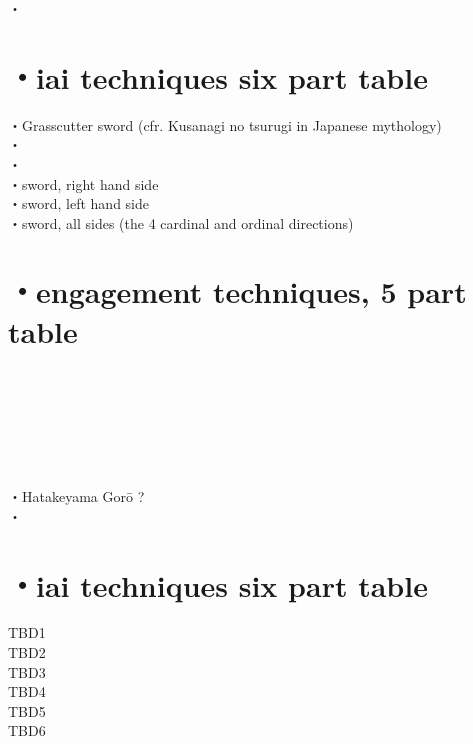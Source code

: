 \documentclass[dvipdfmx, a4paper, 12pt]{utarticle}
\begin{document}
\begin{CJK*}{UTF8}{min}
\begin{landscape}
\setcounter{section}{0}
\newpage
\pagestyle{empty}
・\\
\section{・iai techniques six part table}
\noindent {}・Grasscutter sword (cfr. Kusanagi no tsurugi in Japanese mythology)\\
・\\
・\\
・sword, right hand side\\
・sword, left hand side\\
・sword, all sides (the 4 cardinal and ordinal directions)\\
\section{・engagement techniques, 5 part table}
\noindent {}\\
\\
\\
\\
\\
\\
・Hatakeyama Gor\={o} ?\\

\setcounter{section}{0}
\newpage
\pagestyle{empty}
・\\
\section{・iai techniques six part table}
\noindent TBD1\\
TBD2\\
TBD3\\
TBD4\\
TBD5\\
TBD6\\

\end{landscape}
\end{CJK*}
\end{document}
